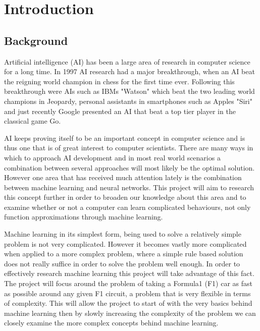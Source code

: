 \chapter{Introduction}


        
\section{Background}


\iffalse
Artificial intelligence (AI) has been a large area of research in computer science for a long time. In 1997 AI research had a major breakthrough, when an AI beat the reigning world champion in chess for the first time ever. Following this breakthrough were AIs such as IBMs "Watson" which beat the two leading world champions in Jeopardy, personal assistants in smartphones such as Apples "Siri" and just recently Google presented an AI that beat a top tier player in the classical game Go.


AI keeps proving itself to be an important concept in computer science and is thus one that is of great interest to computer scientists. There are many ways in which to approach AI development and in most real world scenarios a combination between several approaches will most likely be the optimal solution. However one area that has received much attention lately is the combination between machine learning and neural networks. This project will aim to research this concept further in order to broaden our knowledge about this area and to examine whether or not a computer can learn complicated behaviours, not only function approximations through machine learning. %

Machine learning in its simplest form, being used to solve a relatively simple problem is not very complicated. However it becomes vastly more complicated when applied to a more complex problem, where a simple rule based solution does not really suffice in order to solve the problem well enough. In order to effectively research machine learning this project will take advantage of this fact. The project will focus around the problem of taking a Formula1 (F1) car as fast as possible around any given F1 circuit, a problem that is very flexible in terms of complexity. This will allow the project to start of with the very basics behind machine learning then by slowly increasing the complexity of the problem we can closely examine the more complex concepts behind machine learning.

